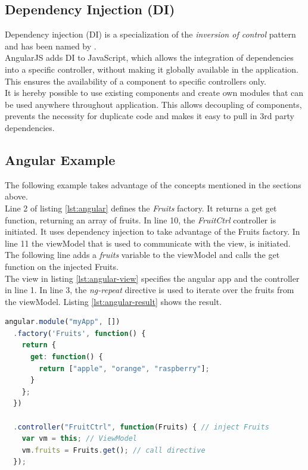 \subsection{Dependency Injection (DI)}
Dependency injection (DI) is a specialization of the \textit{inversion of control} pattern and has been named by \cite{fowler2004inversion}. \\
AngularJS adds DI to JavaScript, which allows the integration of dependencies into a specific controller, without making it globally available in the application. This ensures the availability of a component to specific controllers only.\\
It is hereby possible to use existing components and create own modules that can be used anywhere throughout application. This allows decoupling of components, prevents the necessity for duplicate code and makes it easy to pull in 3rd party dependencies. 


\subsection{Angular Example}
The following example takes advantage of the concepts mentioned in the sections above. \\
Line 2 of listing \ref{lst:angular} defines the \textit{Fruits} factory. It returns a get get function, returning an array of fruits. In line 10, the \textit{FruitCtrl} controller is initiated. It uses dependency injection to take advantage of the Fruits factory. In line 11 the viewModel that is used to communicate with the view, is initiated. The following line adds a \textit{fruits} variable to the viewModel and calls the get function on the injected Fruits.\\
The view in listing \ref{lst:angular-view} specifies the angular app and the controller in line 1. In line 3, the \textit{ng-repeat} directive is used to iterate over the fruits from the viewModel. Listing \ref{lst:angular-result} shows the result.

\begin{lstlisting}[language=javascript, caption=AngularJS directive and controller definition, label=lst:angular]
angular.module("myApp", [])
  .factory('Fruits', function() {
    return {
      get: function() {
        return ["apple", "orange", "raspberry"];
      }
    };
  })
  
  .controller("FruitCtrl", function(Fruits) { // inject Fruits
    var vm = this; // ViewModel
    vm.fruits = Fruits.get(); // call directive
  });
\end{lstlisting}

